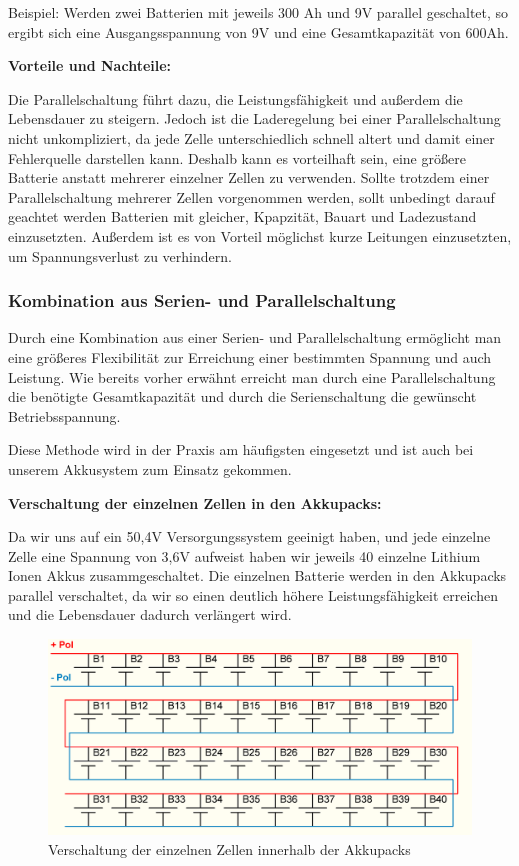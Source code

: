 Beispiel: Werden zwei Batterien mit jeweils 300 Ah und 9V parallel geschaltet, so ergibt sich eine Ausgangsspannung von 9V und eine Gesamtkapazität von 600Ah. \medskip

\textbf{Vorteile und Nachteile:}

Die Parallelschaltung führt dazu, die Leistungsfähigkeit und außerdem die Lebensdauer zu steigern. Jedoch ist die Laderegelung bei einer Parallelschaltung nicht unkompliziert, da jede Zelle unterschiedlich schnell altert und damit einer Fehlerquelle darstellen kann. Deshalb kann es vorteilhaft sein, eine größere Batterie anstatt mehrerer einzelner Zellen zu verwenden. Sollte trotzdem einer Parallelschaltung mehrerer Zellen vorgenommen werden, sollt unbedingt darauf geachtet werden Batterien mit gleicher, Kpapzität, Bauart und Ladezustand einzusetzten. Außerdem ist es von Vorteil möglichst kurze Leitungen einzusetzten, um Spannungsverlust zu verhindern.
\newpage

\subsubsection{Kombination aus Serien- und Parallelschaltung}
Durch eine Kombination aus einer Serien- und Parallelschaltung ermöglicht man eine größeres Flexibilität zur Erreichung einer bestimmten Spannung und auch Leistung. Wie bereits vorher erwähnt erreicht man durch eine Parallelschaltung die benötigte Gesamtkapazität und durch die Serienschaltung die gewünscht Betriebsspannung.

Diese Methode wird in der Praxis am häufigsten eingesetzt und ist auch bei unserem Akkusystem zum Einsatz gekommen.

\textbf{Verschaltung der einzelnen Zellen in den Akkupacks:}

Da wir uns auf ein 50,4V Versorgungssystem geeinigt haben, und jede einzelne Zelle eine Spannung von 3,6V aufweist haben wir jeweils 40 einzelne Lithium Ionen Akkus zusammgeschaltet. Die einzelnen Batterie werden in den Akkupacks parallel verschaltet, da wir so einen deutlich höhere Leistungsfähigkeit erreichen und die Lebensdauer dadurch verlängert wird. 

\begin{figure}[H]
	\begin{center}
		\includegraphics[scale=0.6]{figures/Akku/Anschlussplan 40Zellen.PNG}
		\caption{Verschaltung der einzelnen Zellen innerhalb der Akkupacks}
	\end{center}
\end{figure}
\newpage

